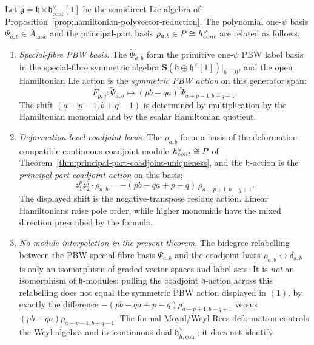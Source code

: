 \documentclass[11pt]{memoir}
\begin{document}
\begin{thm}\label{thm:pbw-vs-deformation}
  Let $\mathfrak g=\mathfrak h\ltimes\mathfrak h^\vee_{\mathrm{cont}}[1]$
  be the semidirect Lie algebra of
  Proposition~\ref{prop:hamiltonian-polyvector-reduction}. The
  polynomial one-$\psi$ basis $\Psi_{a,b}\in\bar A_{\mathrm{desc}}$ and
  the principal-part basis
  $\rho_{a,b}\in P\cong h^\vee_{cont}$ are related
  as follows.
  \begin{enumerate}
    \item \emph{Special-fibre PBW basis.} The $\widetilde\Psi_{a,b}$
      form the primitive one-\(\psi\) PBW label basis in
      the special-fibre symmetric algebra
      $\mathbf S(\mathfrak h\oplus\mathfrak h^\vee[1])\big|_{\hbar=0}$,
      and the open Hamiltonian Lie action is the \emph{symmetric PBW action}
      on this generator span:
      $$F_{p,q}:\widetilde\Psi_{a,b}\longmapsto
        (pb-qa)\,\widetilde\Psi_{a+p-1,b+q-1}.$$
      The shift $(a+p-1,b+q-1)$ is determined by multiplication by the
      Hamiltonian monomial and by the scalar Hamiltonian quotient.
    \item \emph{Deformation-level coadjoint basis.} The $\rho_{a,b}$
      form a basis of the deformation-compatible continuous coadjoint
      module $h^\vee_{cont}\cong P$ of
      Theorem~\ref{thm:principal-part-coadjoint-uniqueness}, and the
      $\mathfrak h$-action is the \emph{principal-part coadjoint action}
      on this basis:
      $$z_1^pz_2^q\cdot\rho_{a,b}=
        -(pb-qa+p-q)\,\rho_{a-p+1,b-q+1}.$$
      The displayed shift is the negative-transpose residue action.
      Linear Hamiltonians raise pole order, while higher monomials have
      the mixed direction prescribed by the formula.
    \item \emph{No module interpolation in the present theorem.} The
      bidegree relabelling between the PBW special-fibre basis
      $\widetilde\Psi_{a,b}$ and the coadjoint basis
      $\rho_{a,b}\leftrightarrow\delta_{a,b}$ is only an isomorphism of
	      graded vector spaces and label sets. It is \emph{not} an
	      isomorphism of $\mathfrak h$-modules: pulling the coadjoint
	      $\mathfrak h$-action across this relabelling does not equal the
	      symmetric PBW action displayed in $(1)$, by exactly the
	      difference $-(pb-qa+p-q)\rho_{a-p+1,b-q+1}$ versus
	      $(pb-qa)\rho_{a+p-1,b+q-1}$. The formal Moyal/Weyl Rees
	      deformation controls the Weyl algebra and its continuous dual
	      $\mathfrak h^\vee_{\hbar,\mathrm{cont}}$; it does not identify

\end{enumerate}
\end{thm}
\end{document}
